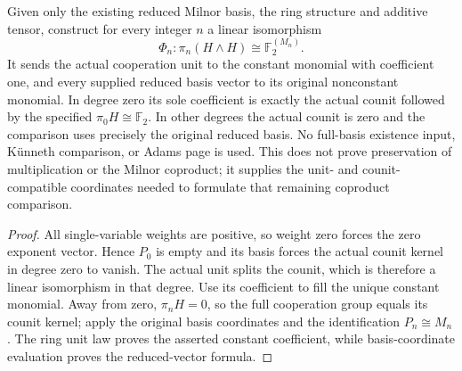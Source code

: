 \begin{proposition}
  \label{prop:h6-full-milnor-coordinates}
  \leanok
  Given only the existing reduced Milnor basis, the ring structure and
  additive tensor, construct for every integer $n$ a linear isomorphism
  \[
    \Phi_n:\pi_n(H\wedge H)\cong\mathbb F_2^{(M_n)}.
  \]
  It sends the actual cooperation unit to the constant monomial with
  coefficient one, and every supplied reduced basis vector to its original
  nonconstant monomial. In degree zero its sole coefficient is exactly
  the actual counit followed by the specified $\pi_0H\cong\mathbb F_2$.
  In other degrees the actual counit is zero and the comparison uses
  precisely the original reduced basis. No full-basis existence input,
  K\"unneth comparison, or Adams page is used.
  This does not prove preservation of multiplication or the Milnor
  coproduct; it supplies the unit- and counit-compatible coordinates
  needed to formulate that remaining coproduct comparison.
\end{proposition}
\begin{proof}
  All single-variable weights are positive, so weight zero forces the
  zero exponent vector. Hence $P_0$ is empty and its basis forces the
  actual counit kernel in degree zero to vanish. The actual unit splits
  the counit, which is therefore a linear isomorphism in that degree.
  Use its coefficient to fill the unique constant monomial. Away from
  zero, $\pi_nH=0$, so the full cooperation group equals its counit kernel;
  apply the original basis coordinates and the identification $P_n\cong M_n$.
  The ring unit law proves the asserted constant coefficient, while
  basis-coordinate evaluation proves the reduced-vector formula.
  \leanok
\end{proof}

